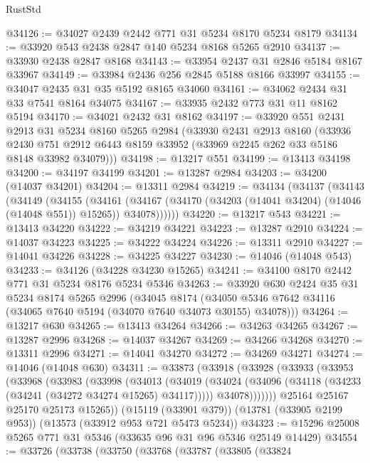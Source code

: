 \begin{lexlean}{RustStd}
\begin{coremodule}
@34126 := @34027 @2439 @2442 @771 @31 @5234 @8170 @5234 @8179
@34134 := @33920 @543 @2438 @2847 @140 @5234 @8168 @5265 @2910
@34137 := @33930 @2438 @2847 @8168
@34143 := @33954 @2437 @31 @2846 @5184 @8167 @33967
@34149 := @33984 @2436 @256 @2845 @5188 @8166 @33997
@34155 := @34047 @2435 @31 @35 @5192 @8165 @34060
@34161 := @34062 @2434 @31 @33 @7541 @8164 @34075
@34167 := @33935 @2432 @773 @31 @11 @8162 @5194
@34170 := @34021 @2432 @31 @8162
@34197 := @33920
    @551
    @2431
    @2913
    @31
    @5234
    @8160
    @5265
    @2984
    (@33930
      @2431
      @2913
      @8160
      (@33936
        @2430
        @751
        @2912
        @6443
        @8159
        @33952
        (@33969 @2245 @262 @33 @5186 @8148 @33982 @34079)))
@34198 := @13217 @551
@34199 := @13413 @34198
@34200 := @34197 @34199
@34201 := @13287 @2984
@34203 := @34200 (@14037 @34201)
@34204 := @13311 @2984
@34219 := @34134
    (@34137
      (@34143
        (@34149
          (@34155
            (@34161
              (@34167 (@34170 (@34203 (@14041 @34204) (@14046 (@14048 @551)) @15265)) @34078))))))
@34220 := @13217 @543
@34221 := @13413 @34220
@34222 := @34219 @34221
@34223 := @13287 @2910
@34224 := @14037 @34223
@34225 := @34222 @34224
@34226 := @13311 @2910
@34227 := @14041 @34226
@34228 := @34225 @34227
@34230 := @14046 (@14048 @543)
@34233 := @34126 (@34228 @34230 @15265)
@34241 := @34100 @8170 @2442 @771 @31 @5234 @8176 @5234 @5346
@34263 := @33920
    @630
    @2424
    @35
    @31
    @5234
    @8174
    @5265
    @2996
    (@34045
      @8174
      (@34050 @5346 @7642 @34116 (@34065 @7640 @5194 (@34070 @7640 @34073 @30155) @34078)))
@34264 := @13217 @630
@34265 := @13413 @34264
@34266 := @34263 @34265
@34267 := @13287 @2996
@34268 := @14037 @34267
@34269 := @34266 @34268
@34270 := @13311 @2996
@34271 := @14041 @34270
@34272 := @34269 @34271
@34274 := @14046 (@14048 @630)
@34311 := @33873
    (@33918
      (@33928
        (@33933
          (@33953
            (@33968
              (@33983
                (@33998
                  (@34013
                    (@34019
                      (@34024 (@34096 (@34118 (@34233 (@34241 (@34272 @34274 @15265) @34117)))))
                      @34078)))))))
        @25164
        @25167
        @25170
        @25173
        @15265))
    (@15119 (@33901 @379))
    (@13781 (@33905 @2199 @953))
    (@13573 (@33912 @953 @721 @5473 @5234))
@34323 := @15296 @25008 @5265 @771 @31 @5346 (@33635 @96 @31 @96 @5346 @25149 @14429)
@34554 := @33726
    (@33738
      (@33750
        (@33768
          (@33787
            (@33805
              (@33824

\end{coremodule}
\end{lexlean}

